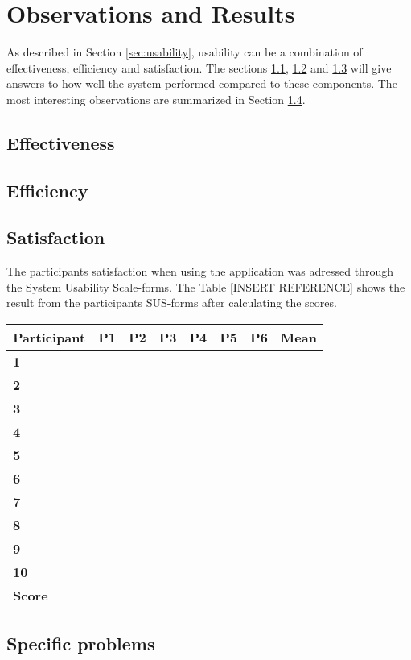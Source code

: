 \section{Observations and Results}

As described in Section \ref{sec:usability}, usability can be a combination of effectiveness, efficiency and satisfaction. The sections \ref{subsec:effectiveness}, \ref{subsec:efficiency} and \ref{subsec:satisfaction} will give answers to how well the system performed compared to these components. The most interesting observations are summarized in Section \ref{subsec:specificproblems}.

\subsection{Effectiveness}
\label{subsec:effectiveness}


\subsection{Efficiency}
\label{subsec:efficiency}


\subsection{Satisfaction}
\label{subsec:satisfaction}

The participants satisfaction when using the application was adressed through the System Usability Scale-forms. The Table [INSERT REFERENCE] shows the result from the participants SUS-forms after calculating the scores.

\begin{center}
	\begin{tabular}{| p{2.5cm} | p{1.5cm} | p{1.5cm} | p{1.5cm} | p{1.5cm} | p{1.5cm} | p{1.5cm} | p{1.5cm} | }
	\textbf{Participant} & P1 & P2 & P3 & P4 & P5 & P6 & Mean \\ \hline
	\textbf{1} & & & & & & & \\ \hline
	\textbf{2} & & & & & & & \\ \hline
	\textbf{3} & & & & & & & \\ \hline
	\textbf{4} & & & & & & & \\ \hline
	\textbf{5} & & & & & & & \\ \hline
	\textbf{6} & & & & & & & \\ \hline
	\textbf{7} & & & & & & & \\ \hline
	\textbf{8} & & & & & & & \\ \hline
	\textbf{9} & & & & & & & \\ \hline
	\textbf{10} & & & & & & & \\ \hline
	\textbf{Score} & & & & & & & \\ \hline
	\end{tabular}
\end{center}


\subsection{Specific problems}
\label{subsec:specificproblems}